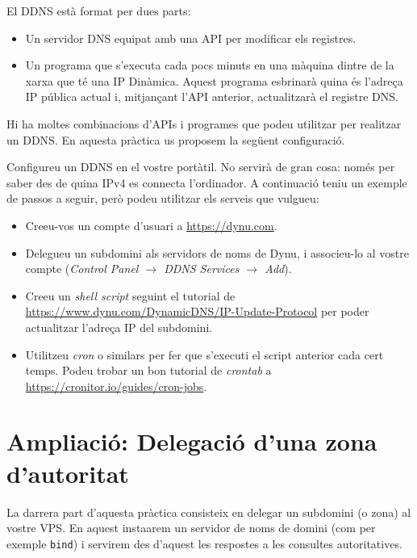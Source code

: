 \documentclass{practicaitic}
\begin{document}
El DDNS està format per dues parts:
\begin{itemize}
  \item Un servidor DNS equipat amb una API per modificar els registres.
  \item Un programa que s'executa cada pocs minuts en una màquina dintre de
  la xarxa que té una IP Dinàmica. Aquest programa esbrinarà quina és
  l'adreça IP pública actual i, mitjançant l'API anterior, actualitzarà
  el registre DNS.
\end{itemize}

Hi ha moltes combinacions d'APIs i programes que podeu utilitzar per
realitzar un DDNS. En aquesta pràctica us proposem la següent configuració.

\begin{tasca}
  Configureu un DDNS en el vostre portàtil. No servirà de gran cosa: només per
  saber des de quina IPv4 es connecta l'ordinador. A continuació teniu
  un exemple de passos a seguir, però podeu utilitzar els serveis que vulgueu:

  \begin{itemize}
    \item Creeu-vos un compte d'usuari a \url{https://dynu.com}.
    \item Delegueu un subdomini als servidors de noms de Dynu, i associeu-lo
    al vostre compte (\textit{Control Panel $\to$ DDNS Services $\to$ Add}).
    \item Creeu un \textit{shell script} seguint el tutorial de
    \url{https://www.dynu.com/DynamicDNS/IP-Update-Protocol} per poder
    actualitzar l'adreça IP del subdomini.
    \item Utilitzeu \textit{cron} o similars per fer que s'executi el script
    anterior cada cert temps. Podeu trobar un bon tutorial de \textit{crontab}
    a \url{https://cronitor.io/guides/cron-jobs}.
  \end{itemize}
\end{tasca}


\section{Ampliació: Delegació d'una zona d'autoritat}

La darrera part d'aquesta pràctica consisteix en delegar un subdomini (o zona)
al vostre VPS. En aquest insta\lgem arem un servidor de noms de domini
(com per exemple \texttt{bind}) i servirem des d'aquest les respostes
a les consultes autoritatives.
\end{document}
